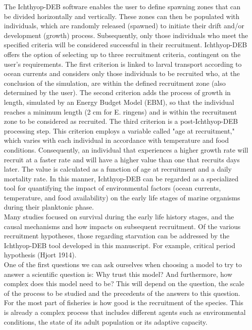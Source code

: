The Ichthyop-DEB software enables the user to define spawning zones that can be divided horizontally and vertically. These zones can then be populated with individuals, which are randomly released (spawned) to initiate their drift and/or development (growth) process. Subsequently, only those individuals who meet the specified criteria will be considered successful in their recruitment. Ichthyop-DEB offers the option of selecting up to three recruitment criteria, contingent on the user's requirements. The first criterion is linked to larval transport according to ocean currents and considers only those individuals to be recruited who, at the conclusion of the simulation, are within the defined recruitment zone (also determined by the user). The second criterion adds the process of growth in length, simulated by an Energy Budget Model (EBM), so that the individual reaches a minimum length (2 cm for E. ringens) and is within the recruitment zone to be considered as recruited. The third criterion is a post-Ichthyop-DEB processing step. This criterion employs a variable called "age at recruitment," which varies with each individual in accordance with temperature and food conditions. Consequently, an individual that experiences a higher growth rate will recruit at a faster rate and will have a higher value than one that recruits days later. The value is calculated as a function of age at recruitment and a daily mortality rate. In this manner, Ichthyop-DEB can be regarded as a specialized tool for quantifying the impact of environmental factors (ocean currents, temperature, and food availability) on the early life stages of marine organisms during their planktonic phase.\\

Many studies focused on survival during the early life history stages, and the causal mechanisms and how impacts on subsequent recruitment. Of the various recruitment hypotheses, those regarding starvation can be addressed by the Ichthyop-DEB tool developed in this manuscript. For example, critical period hypothesis (Hjort 1914).\\

One of the first questions we can ask ourselves when choosing a model to try to answer a scientific question is: Why trust this model? And furthermore, how complex does this model need to be? This will depend on the question, the scale of the process to be studied and the precedents of the answers to this question. For the most part of fisheries is how good is the recruitment of the species. This is already a complex process that includes different agents such as environmental conditions, the state of its adult population or its adaptive capacity.\\

